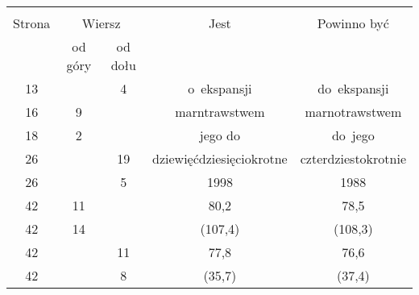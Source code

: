 \documentclass[a4paper,11pt]{article}
\begin{document}
\vspace{\spaceFour}



\begin{center}
  \begin{tabular}{|c|c|c|c|c|}
    \hline
    & \multicolumn{2}{c|}{} & & \\
    Strona & \multicolumn{2}{c|}{Wiersz} & Jest
                              & Powinno być \\ \cline{2-3}
    & od góry & od dołu & & \\
    \hline
    13  & &  4 & o~ekspansji & do~ekspansji \\
    16  &  9 & & marntrawstwem & marnotrawstwem \\
    18  &  2 & & jego do & do~jego \\
    26  & & 19 & dziewięćdziesięciokrotne & czterdziestokrotnie \\
    26  & &  5 & 1998 & 1988 \\
    42  & 11 & & 80,2 & 78,5 \\
    42  & 14 & & (107,4) & (108,3) \\
    42  & & 11 & 77,8 &  76,6 \\
    42  & &  8 & (35,7) & (37,4) \\
    \hline
  \end{tabular}
\end{center}

\vspace{\spaceTwo}







\end{document}

